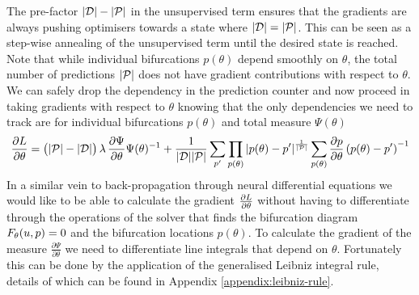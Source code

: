 The pre-factor $|\mathcal{D}|-|\mathcal{P}|$ in the unsupervised term ensures that the gradients are always pushing optimisers towards a state where $|\mathcal{D}|=|\mathcal{P}|$. This can be seen as a step-wise annealing of the unsupervised term until the desired state is reached. Note that while individual bifurcations $p(\theta)$ depend smoothly on $\theta$, the total number of predictions $|\mathcal{P}|$ does not have gradient contributions with respect to $\theta$. We can safely drop the dependency in the prediction counter and now proceed in taking gradients with respect to $\theta$ knowing that the only dependencies we need to track are for individual bifurcations $p(\theta)$ and total measure $\Psi(\theta)$
\begin{align}
    \frac{\partial L}{\partial\theta}=
    \big(|\mathcal{P}|-|\mathcal{D}|\big)\,\lambda\,
    \frac{\partial \Psi}{\partial\theta}\Psi(\theta)^{-1}+
    \frac{1}{|\mathcal{D}||\mathcal{P}|}\sum_{p'}
    \prod_{p(\theta)}|p(\theta)-p'|^{\frac{1}{|\mathcal{P}|}}
    \sum_{p(\theta)}\frac{\partial p}{\partial\theta}\left(p(\theta)-p'\right)^{-1}
    \label{eq:gradient-loss}
\end{align}
In a similar vein to back-propagation through neural differential equations \cite{Chen2018NeuralEquations} we would like to be able to calculate the gradient $\frac{\partial L}{\partial\theta}$ without having to differentiate through the operations of the solver that finds the bifurcation diagram $F_{\theta}(u,p)=0$ and the bifurcation locations $p(\theta)$. To calculate the gradient of the measure $\frac{\partial \Psi}{\partial\theta}$ we need to differentiate line integrals that depend on $\theta$. Fortunately this can be done by the application of the generalised Leibniz integral rule, details of which can be found in Appendix \ref{appendix:leibniz-rule}.


